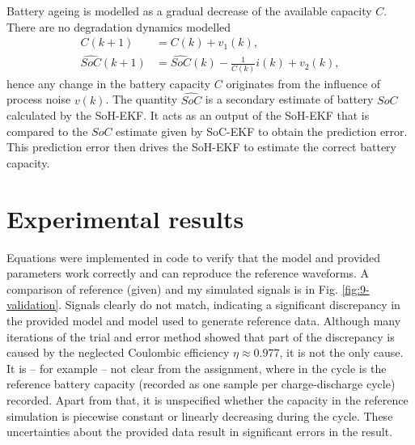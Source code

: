 Battery ageing is modelled as a gradual decrease of the available capacity $C$. There are no degradation dynamics modelled
\begin{align}
    C(k+1) &= C(k) + v_1(k), \\
    \hat{SoC}(k+1) &= \hat{SoC}(k) - \frac{1}{C(k)}i(k) + v_2(k),
\end{align}
hence any change in the battery capacity $C$ originates from the influence of process noise $v(k)$. The quantity $\hat{SoC}$ is a secondary estimate of battery $SoC$ calculated by the SoH-EKF. It acts as an output of the SoH-EKF that is compared to the $SoC$ estimate given by SoC-EKF to obtain the prediction error. This prediction error then drives the SoH-EKF to estimate the correct battery capacity.
\clearpage
\section{Experimental results}

Equations were implemented in code to verify that the model and provided parameters work correctly and can reproduce the reference waveforms. A comparison of reference (given) and my simulated signals is in Fig. \ref{fig:9-validation}. Signals clearly do not match, indicating a significant discrepancy in the provided model and model used to generate reference data.
Although many iterations of the trial and error method showed that part of the discrepancy is caused by the neglected Coulombic efficiency $\eta \approx 0.977$, it is not the only cause. It is -- for example -- not clear from the assignment, where in the cycle is the reference battery capacity (recorded as one sample per charge-discharge cycle) recorded. Apart from that, it is unspecified whether the capacity in the reference simulation is piecewise constant or linearly decreasing during the cycle. These uncertainties about the provided data result in significant errors in the result.



